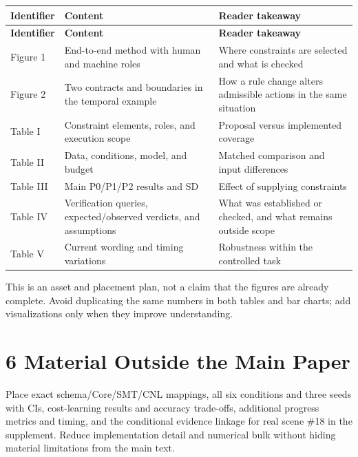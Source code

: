 \documentclass[11pt,a4paper]{article}
\begin{document}
\begingroup\small
\begin{longtable}{@{}>{\raggedright\arraybackslash}p{}>{\raggedright\arraybackslash}p{}>{\raggedright\arraybackslash}p{}@{}}
\toprule
\textbf{Identifier} & \textbf{Content} & \textbf{Reader takeaway} \\
\midrule\endfirsthead
\toprule
\textbf{Identifier} & \textbf{Content} & \textbf{Reader takeaway} \\
\midrule\endhead
\bottomrule\endfoot
Figure 1 & End-to-end method with human and machine roles & Where constraints are selected and what is checked \\
Figure 2 & Two contracts and boundaries in the temporal example & How a rule change alters admissible actions in the same situation \\
Table I & Constraint elements, roles, and execution scope & Proposal versus implemented coverage \\
Table II & Data, conditions, model, and budget & Matched comparison and input differences \\
Table III & Main P0/P1/P2 results and SD & Effect of supplying constraints \\
Table IV & Verification queries, expected/observed verdicts, and assumptions & What was established or checked, and what remains outside scope \\
Table V & Current wording and timing variations & Robustness within the controlled task \\
\end{longtable}
\endgroup

This is an asset and placement plan, not a claim that the figures are already complete. Avoid duplicating the same numbers in both tables and bar charts; add visualizations only when they improve understanding.\par

\section*{6 Material Outside the Main Paper}

Place exact schema/Core/SMT/CNL mappings, all six conditions and three seeds with CIs, cost-learning results and accuracy trade-offs, additional progress metrics and timing, and the conditional evidence linkage for real scene \#18 in the supplement. Reduce implementation detail and numerical bulk without hiding material limitations from the main text.\par
\end{document}
